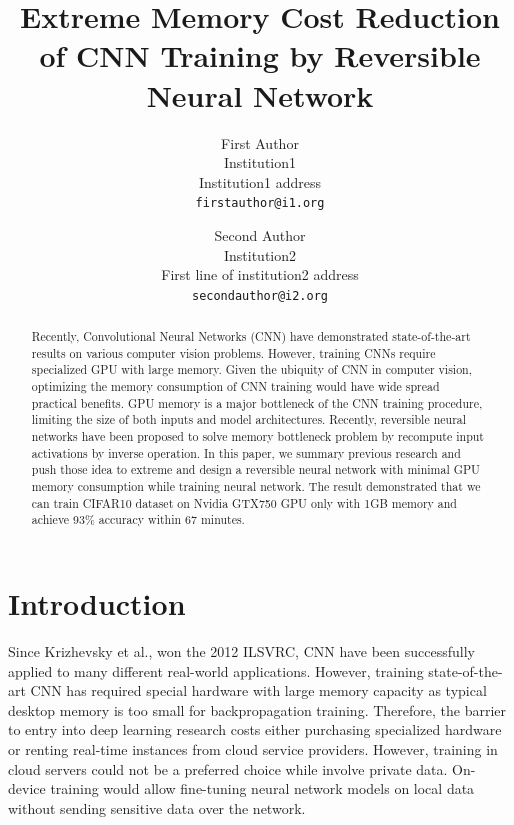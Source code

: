 \documentclass[10pt,twocolumn,letterpaper]{article}
\begin{document}
\title{Extreme Memory Cost Reduction of CNN Training by Reversible Neural Network }

\author{First Author\\
Institution1\\
Institution1 address\\
{\tt\small firstauthor@i1.org}
\and
Second Author\\
Institution2\\
First line of institution2 address\\
{\tt\small secondauthor@i2.org}
}

\maketitle
\ificcvfinal\thispagestyle{empty}\fi

\begin{abstract}
   Recently, Convolutional Neural Networks (CNN) have demonstrated state-of-the-art results on various computer vision problems. However, training CNNs require specialized GPU with large memory. Given the ubiquity of CNN in computer vision, optimizing the memory consumption of CNN training would have wide spread practical benefits. GPU memory is a major bottleneck of the CNN training procedure, limiting the size of both inputs and model architectures. Recently, reversible neural networks have been proposed to solve memory bottleneck problem by recompute input activations by inverse operation. In this paper, we summary previous research and push those idea to extreme and design a reversible neural network with minimal GPU memory consumption while training neural network. The result demonstrated that we can train CIFAR10 dataset on Nvidia GTX750 GPU only with 1GB memory and achieve 93\% accuracy within 67 minutes.
   
   
\end{abstract}


\section{Introduction}
  Since Krizhevsky et al., won the 2012 ILSVRC, CNN have been successfully applied to many different real-world applications. However, training state-of-the-art CNN has required special hardware with large memory capacity as typical desktop memory is too small for backpropagation training. Therefore, the barrier to entry into deep learning research costs either purchasing specialized hardware or renting real-time instances from cloud service providers. However, training in cloud servers could not be a preferred choice while involve private data. On-device training would allow fine-tuning neural network models on local data without sending sensitive data over the network.
\end{document}
